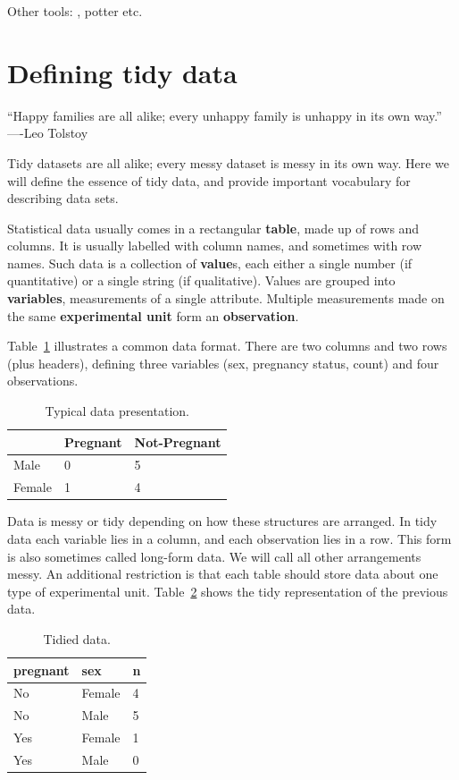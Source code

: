 \documentclass[oneside]{article}
\begin{document}
Other tools: \citep{kandel:2011}, potter etc.

\section{Defining tidy data}

``Happy families are all alike; every unhappy family is unhappy in its own way.'' ----Leo Tolstoy

Tidy datasets are all alike; every messy dataset is messy in its own way. Here we will define the essence of tidy data, and provide important vocabulary for describing data sets.

Statistical data usually comes in a rectangular \textbf{table}, made up of rows and columns. It is usually labelled with column names, and sometimes with row names. Such data is a collection of \textbf{value}s, each either a single number (if quantitative) or a single string (if qualitative). Values are grouped into \textbf{variables}, measurements of a single attribute. Multiple measurements made on the same \textbf{experimental unit} form an \textbf{observation}. 

Table~\ref{tbl:preg-raw} illustrates a common data format. There are two columns and two rows (plus headers), defining three variables (sex, pregnancy status, count) and four observations.

\begin{table}[htbp]
  \centering
  \begin{tabular}{l|ll}
  \toprule
         & Pregnant & Not-Pregnant \\
  \midrule
  Male   &        0 &            5 \\
  Female &        1 &            4 \\
  \bottomrule
  \end{tabular}
  \caption{Typical data presentation.}
  \label{tbl:preg-raw}
\end{table}

Data is messy or tidy depending on how these structures are arranged. In tidy data each variable lies in a column, and each observation lies in a row. This form is also sometimes called long-form data. We will call all other arrangements messy. An additional restriction is that each table should store data about one type of experimental unit. Table~\ref{tbl:preg-tidy} shows the tidy representation of the previous data.

\begin{table}[htbp]
  \centering
  \begin{tabular}{ll|l}
    \toprule
    pregnant &  sex    & n  \\
    \midrule
    No       &  Female & 4  \\
    No       &  Male   & 5  \\
    Yes      &  Female & 1  \\
    Yes      &  Male   & 0  \\
    \bottomrule
  \end{tabular}
  \caption{Tidied data.}
  \label{tbl:preg-tidy}
\end{table}
\end{document}
